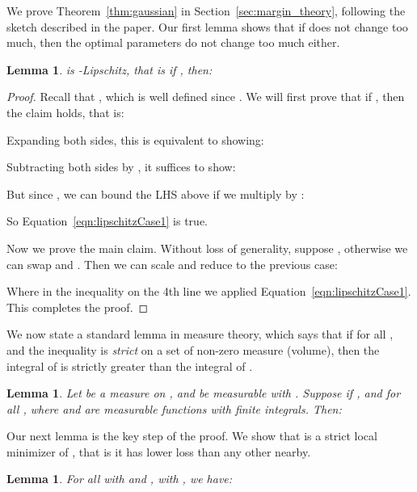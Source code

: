 \documentclass[11pt]{article}
\newtheorem{lemma}[theorem]{Lemma}
\begin{document}
We prove Theorem~\ref{thm:gaussian} in Section~\ref{sec:margin_theory}, following the sketch described in the paper.
Our first lemma shows that if  does not change too much, then the optimal parameters  do not change too much either.

\begin{lemma}
\label{lem:lipschitzGaussian}
 is -Lipschitz, that is if , then:

\end{lemma}

\begin{proof}
Recall that , which is well defined since .
We will first prove that if , then the claim holds, that is:

Expanding both sides, this is equivalent to showing:

Subtracting both sides by , it suffices to show:

But since , we can bound the LHS above if we multiply by :

So Equation~\eqref{eqn:lipschitzCase1} is true.

Now we prove the main claim.
Without loss of generality, suppose , otherwise we can swap  and .
Then we can scale  and reduce to the previous case:

Where in the inequality on the 4th line we applied Equation~\eqref{eqn:lipschitzCase1}. This completes the proof.

\end{proof}

We now state a standard lemma in measure theory, which says that if  for all , and the inequality is \emph{strict} on a set of non-zero measure (volume), then the integral of  is strictly greater than the integral of .

\begin{lemma}
\label{lem:basicExpectationBound}
Let  be a measure on , and  be measurable with .
Suppose  if , and  for all , where  and  are measurable functions with finite integrals.
Then:

\end{lemma}

Our next lemma is the key step of the proof.
We show that  is a strict local minimizer of , that is it has lower loss than any other  nearby.

\begin{lemma}
\label{lem:localMinGaussian}
For all  with  and , with , we have:

\end{lemma}
\end{document}
